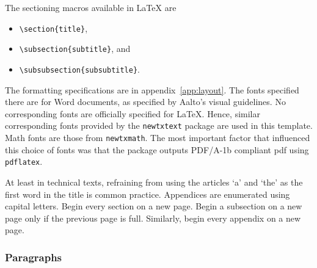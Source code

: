 \documentclass[english, 12pt, a4paper, elec, utf8, a-2b, online]{aaltothesis}
\begin{document}
The sectioning macros available in \LaTeX{} are 
\begin{itemize}
	\setlength{\itemsep}{0pt}
	\item[] \verb+\section{title}+,
	\item[] \verb+\subsection{subtitle}+, and
	\item[] \verb+\subsubsection{subsubtitle}+.
\end{itemize}

The formatting specifications are in appendix~\ref{app:layout}. The fonts 
specified there are for Word documents, as specified by Aalto's visual 
guidelines. No corresponding fonts are officially specified for \LaTeX{}. Hence,
similar corresponding fonts provided by the \verb+newtxtext+ package are used in
this template. Math fonts are those from \verb+newtxmath+. The most important 
factor that influenced this choice of fonts was that the package outputs 
PDF/A-1b compliant pdf using \texttt{pdflatex}.

At least in technical texts, refraining from using the articles ‘a’ and ‘the’ as
the first word in the title is common practice. Appendices are enumerated using 
capital letters. Begin every section on a new page. Begin a subsection on a new 
page only if the previous page is full. Similarly, begin every appendix on a new
page.

\subsubsection{Paragraphs}
\end{document}
